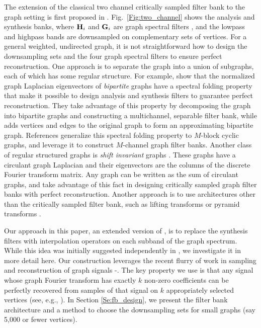 \documentclass[journal, 10pt]{IEEEtran}
\begin{document}
The extension of the classical two channel critically sampled filter bank to the graph setting is first proposed in \cite{narang_icip}. Fig.\ \ref{Fig:two_channel} shows the analysis and synthesis banks, where ${\bf H}_i$ and ${\bf G}_i$ are graph spectral filters \cite{shuman2013emerging}, and the lowpass and highpass bands are downsampled on complementary sets of vertices. For a general weighted, undirected graph, it is not straightforward %
how to design the downsampling sets and the four graph spectral filters to ensure perfect reconstruction. One approach is to separate the graph into a union of subgraphs, each of which has some regular structure. For example, \cite{narang2012perfect,narang_bior_filters} show that the normalized graph Laplacian eigenvectors of \emph{bipartite} graphs have a spectral folding property that make it possible to design analysis and synthesis filters to guarantee perfect reconstruction. They take advantage of this property by decomposing the graph into bipartite graphs and constructing a multichannel, separable filter bank, while \cite{sakiyama} adds vertices and edges to the original graph to form an approximating bipartite graph. References \cite{teke2016,teke2017ii} generalize this spectral folding property to $M$-block cyclic graphs, and leverage it to construct $M$-channel graph filter banks. Another class of regular structured graphs is \emph{shift invariant} graphs \cite[Chapter 5.1]{grady}. These graphs have a circulant graph Laplacian and their eigenvectors are the columns of the discrete Fourier transform matrix. Any graph can be written as the sum of circulant graphs, and \cite{ekambaram_icip,ekambaram2013globalsip,kotzagiannidis2016icassp} take advantage of this fact in designing critically sampled graph filter banks with perfect reconstruction. Another approach is to use architectures other than the critically sampled filter bank, such as lifting transforms \cite{jansen,narang_lifting_graphs} or pyramid transforms \cite{shuman_TSP_multiscale}.

Our approach in this paper, an extended version of \cite{jin_conf}, is to replace the synthesis filters with interpolation operators on each subband of the graph spectrum. While this idea was initially suggested independently in \cite{chen2015discrete}, we investigate it in more detail here. Our construction leverages the recent flurry of work in sampling and reconstruction of graph signals \cite{chen2015discrete}-\nocite{pesenson_paley,narang2013interpolation,anis2014towards,gadde2015probabilistic,shomorony,PuyTGV15,chen2015signal,tsitsvero2016uncertainty,chen2016signal,anis2016efficient}\cite{di2017sampling}. The key property we use is that any signal whose graph Fourier transform has exactly $k$ non-zero coefficients can be perfectly recovered from samples of that signal on $k$ appropriately selected vertices (see, e.g., \cite[Theorem 1]{chen2015discrete} \cite[Proposition 1]{anis2016efficient}). In Section \ref{Se:fb_design}, we present the filter bank architecture and a method to choose the downsampling sets for small graphs 
(say 5,000 or fewer vertices). 
\end{document}
